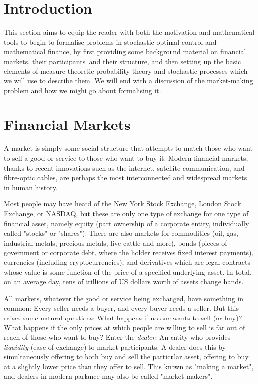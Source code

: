 \section{Introduction}
This section aims to equip the reader with both the motivation and mathematical tools to begin to formalise problems in stochastic optimal control and mathematical finance, by first providing some background material on financial markets, their participants, and their structure, and then setting up the basic elements of measure-theoretic probability theory and stochastic processes which we will use to describe them. We will end with a discussion of the market-making problem and how we might go about formalising it.
\section{Financial Markets}
A market is simply some social structure that attempts to match those who want to sell a good or service to those who want to buy it. Modern financial markets, thanks to recent innovations such as the internet, satellite communication, and fibre-optic cables, are perhaps the most interconnected and widespread markets in human history. 

Most people may have heard of the New York Stock Exchange, London Stock Exchange, or NASDAQ, but these are only one type of exchange for one type of financial asset, namely equity (part ownership of a corporate entity, individually called "stocks" or "shares"). There are also markets for commodities (oil, gas, industrial metals, precious metals, live cattle and more), bonds (pieces of government or corporate debt, where the holder receives fixed interest payments), currencies (including cryptocurrencies), and derivatives which are legal contracts whose value is some function of the price of a specified underlying asset. In total, on an average day, tens of trillions of US dollars worth of assets change hands.

All markets, whatever the good or service being exchanged, have something in common: Every seller needs a buyer, and every buyer needs a seller. But this raises some natural questions: What happens if no-one wants to sell (or buy)? What happens if the only prices at which people are willing to sell is far out of reach of those who want to buy? Enter the \textit{dealer}: An entity who provides \textit{liquidity} (ease of exchange) to market participants. A dealer does this by simultaneously offering to both buy and sell the particular asset, offering to buy at a slightly lower price than they offer to sell. This known as "making a market", and dealers in modern parlance may also be called "market-makers".

